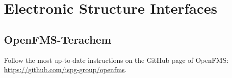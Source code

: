 \documentclass[11pt]{article}
\begin{document}
%
%
%
%
%
%
% 
%
%


\newpage \section{Electronic Structure Interfaces}
\label{elecstruc} 



\subsection{OpenFMS-Terachem}
\label{fms90tc}
Follow the most up-to-date instructions on the GitHub page of OpenFMS: \url{https://github.com/ispg-group/openfms}.
\end{document}
